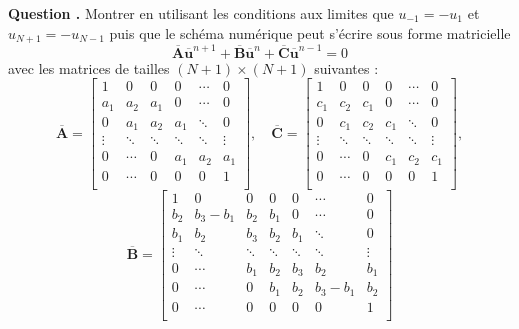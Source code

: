 \documentclass[a4,12pt]{article}
\newcommand{\A}{\mathbf{A}}
\newcommand{\B}{\mathbf{B}}
\newcommand{\C}{\mathbf{C}}
\newcommand{\ub}{\mathbf{u}}
\newcounter{Nbquestion}
\newcommand*\question{%
\stepcounter{Nbquestion}%
\textbf{Question \theNbquestion. }}
\begin{document}
\begin{mdframed}[style=exampledefault]

\question Montrer en utilisant les conditions aux limites que $u_{-1}=-u_1$ et $u_{N+1}=-u_{N-1}$ puis que le schéma numérique peut s'écrire sous forme matricielle 
\begin{equation}
	\overline{\A} \overline{\ub}^{n+1}+\overline{\B} \overline{\ub}^n+\overline{\C} \overline{\ub}^{n-1}=0
\end{equation} 
avec les matrices de tailles $(N+1)\times (N+1)$ suivantes : 
\[
\overline{\A}=
\begin{bmatrix}
1 & 0 & 0 & 0 & \cdots & 0 \\ 
a_1 & a_2 & a_1 & 0 & \cdots & 0 \\ 
0 & a_1 & a_2 & a_1 & \ddots & 0 \\
\vdots & \ddots & \ddots & \ddots & \ddots & \vdots \\ 
0 & \cdots & 0 & a_1 & a_2 & a_1\\ 
0 & \cdots & 0 & 0 & 0 & 1 \\
\end{bmatrix},\quad 
\overline{\C}=
\begin{bmatrix}
1 & 0 & 0 & 0 & \cdots & 0 \\ 
c_1 & c_2 & c_1 & 0 & \cdots & 0 \\
0 & c_1 & c_2 & c_1 & \ddots & 0 \\ 
\vdots & \ddots & \ddots & \ddots & \ddots & \vdots \\
0 & \cdots & 0 & c_1 & c_2 & c_1 \\
0 & \cdots & 0 & 0 & 0 & 1 \\
\end{bmatrix},
\]
\[ 
\overline{\B}=
\begin{bmatrix}
1 & 0 & 0 & 0 & 0  & \cdots & 0 \\ 
b_2 & b_3-b_1 & b_2 & b_1 & 0 & \cdots & 0 \\ 
b_1 & b_2 & b_3 & b_2 & b_1 & \ddots & 0 \\
\vdots & \ddots & \ddots & \ddots & \ddots & \ddots & \vdots \\ 
0 & \cdots & b_1 & b_2 & b_3 & b_2 & b_1 \\ 
0 & \cdots &  0 & b_1 & b_2 & b_3-b_1 & b_2 \\ 
0 & \cdots & 0 & 0 &  0 & 0 & 1 \\
\end{bmatrix}
\]
\end{mdframed}
\end{document}
